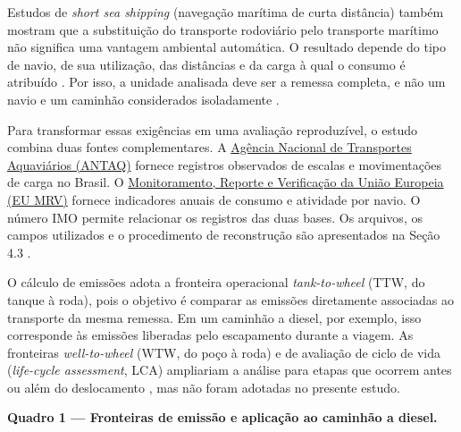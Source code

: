\documentclass[brazil,]{article}
\newcommand{\keeptable}{\Needspace{0.64\textheight}}
\begin{document}
Estudos de \emph{short sea shipping} (navegação marítima de curta
distância) também mostram que a substituição do transporte rodoviário
pelo transporte marítimo não significa uma vantagem ambiental
automática. O resultado depende do tipo de navio, de sua utilização, das
distâncias e da carga à qual o consumo é atribuído \parencite{shortsea2019}.
Por isso, a unidade analisada deve ser a remessa completa, e não um
navio e um caminhão considerados isoladamente
\parencite{modalshiftreview2020}.

Para transformar essas exigências em uma avaliação reproduzível, o
estudo combina duas fontes complementares. A
\href{https://estatistica.antaq.gov.br/ea/sense/download.html}{Agência
Nacional de Transportes Aquaviários (ANTAQ)} fornece registros
observados de escalas e movimentações de carga no Brasil. O
\href{https://mrv.emsa.europa.eu/}{Monitoramento, Reporte e Verificação
da União Europeia (EU MRV)} fornece indicadores anuais de consumo e
atividade por navio. O número IMO permite relacionar os registros das
duas bases. Os arquivos, os campos utilizados e o procedimento de
reconstrução são apresentados na Seção 4.3
\parencite{antaq2025,emsa2026}.

O cálculo de emissões adota a fronteira operacional \emph{tank-to-wheel}
(TTW, do tanque à roda), pois o objetivo é comparar as emissões
diretamente associadas ao transporte da mesma remessa. Em um caminhão a
diesel, por exemplo, isso corresponde às emissões liberadas pelo
escapamento durante a viagem. As fronteiras \emph{well-to-wheel} (WTW,
do poço à roda) e de avaliação de ciclo de vida (\emph{life-cycle
assessment}, LCA) ampliariam a análise para etapas que ocorrem antes ou
além do deslocamento \parencite{decarb2024,maritimelca2024}, mas não foram
adotadas no presente estudo.

\keeptable
\textbf{Quadro 1 --- Fronteiras de emissão e aplicação ao caminhão a
diesel.}
\end{document}
